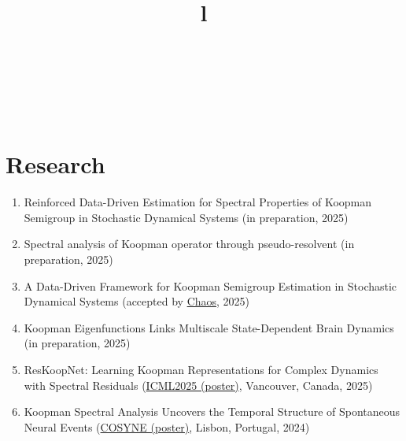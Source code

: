 \documentclass[margin]{res}
\begin{document}
\begin{resume}




\begin{format}
\title{l}\\
\\
\body\\
\end{format}


\section{Research}

\begin{enumerate}
    \item Reinforced Data-Driven Estimation for Spectral Properties of Koopman Semigroup in Stochastic Dynamical Systems (in preparation, 2025)
    
    \item Spectral analysis of Koopman operator through pseudo-resolvent (in preparation, 2025)
    
    \item A Data-Driven Framework for Koopman Semigroup Estimation in Stochastic Dynamical Systems (accepted by \href{https://arxiv.org/abs/2501.13301}{Chaos}, 2025) 

    \item Koopman Eigenfunctions Links Multiscale State-Dependent Brain Dynamics (in preparation, 2025)

    \item ResKoopNet: Learning Koopman Representations for Complex Dynamics with Spectral Residuals (\href{https://icml.cc/virtual/2025/poster/45196}{ICML2025 (poster)}, Vancouver, Canada, 2025)

    \item  Koopman Spectral Analysis Uncovers the Temporal Structure of Spontaneous Neural Events (\href{https://static1.squarespace.com/static/6102ca347474c263c40150cd/t/65e1abbdf843e41837fc9c0d/1709288389623/Cosyne2024_program_book.pdf}{COSYNE (poster)}, Lisbon, Portugal, 2024)


\end{enumerate}
\end{resume}
\end{document}
